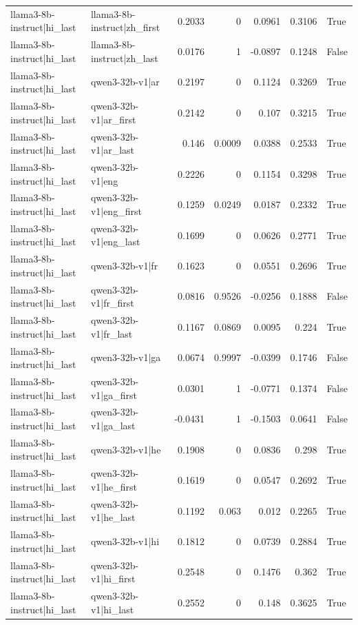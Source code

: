 \begin{table}
\begin{tabular}{l l r r r r l}
llama3-8b-instruct|hi_last & llama3-8b-instruct|zh_first & 0.2033 & 0 & 0.0961 & 0.3106 & True \\
llama3-8b-instruct|hi_last & llama3-8b-instruct|zh_last & 0.0176 & 1 & -0.0897 & 0.1248 & False \\
llama3-8b-instruct|hi_last & qwen3-32b-v1|ar & 0.2197 & 0 & 0.1124 & 0.3269 & True \\
llama3-8b-instruct|hi_last & qwen3-32b-v1|ar_first & 0.2142 & 0 & 0.107 & 0.3215 & True \\
llama3-8b-instruct|hi_last & qwen3-32b-v1|ar_last & 0.146 & 0.0009 & 0.0388 & 0.2533 & True \\
llama3-8b-instruct|hi_last & qwen3-32b-v1|eng & 0.2226 & 0 & 0.1154 & 0.3298 & True \\
llama3-8b-instruct|hi_last & qwen3-32b-v1|eng_first & 0.1259 & 0.0249 & 0.0187 & 0.2332 & True \\
llama3-8b-instruct|hi_last & qwen3-32b-v1|eng_last & 0.1699 & 0 & 0.0626 & 0.2771 & True \\
llama3-8b-instruct|hi_last & qwen3-32b-v1|fr & 0.1623 & 0 & 0.0551 & 0.2696 & True \\
llama3-8b-instruct|hi_last & qwen3-32b-v1|fr_first & 0.0816 & 0.9526 & -0.0256 & 0.1888 & False \\
llama3-8b-instruct|hi_last & qwen3-32b-v1|fr_last & 0.1167 & 0.0869 & 0.0095 & 0.224 & True \\
llama3-8b-instruct|hi_last & qwen3-32b-v1|ga & 0.0674 & 0.9997 & -0.0399 & 0.1746 & False \\
llama3-8b-instruct|hi_last & qwen3-32b-v1|ga_first & 0.0301 & 1 & -0.0771 & 0.1374 & False \\
llama3-8b-instruct|hi_last & qwen3-32b-v1|ga_last & -0.0431 & 1 & -0.1503 & 0.0641 & False \\
llama3-8b-instruct|hi_last & qwen3-32b-v1|he & 0.1908 & 0 & 0.0836 & 0.298 & True \\
llama3-8b-instruct|hi_last & qwen3-32b-v1|he_first & 0.1619 & 0 & 0.0547 & 0.2692 & True \\
llama3-8b-instruct|hi_last & qwen3-32b-v1|he_last & 0.1192 & 0.063 & 0.012 & 0.2265 & True \\
llama3-8b-instruct|hi_last & qwen3-32b-v1|hi & 0.1812 & 0 & 0.0739 & 0.2884 & True \\
llama3-8b-instruct|hi_last & qwen3-32b-v1|hi_first & 0.2548 & 0 & 0.1476 & 0.362 & True \\
llama3-8b-instruct|hi_last & qwen3-32b-v1|hi_last & 0.2552 & 0 & 0.148 & 0.3625 & True \\

\end{tabular}
\end{table}
